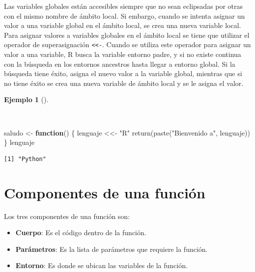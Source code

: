 \documentclass[
  spanish,
  a4paper,
]{scrreport}
\newenvironment{Shaded}{\begin{snugshade}}{\end{snugshade}}
\newcommand{\ControlFlowTok}[1]{\textcolor[rgb]{0.00,0.23,0.31}{\textbf{#1}}}
\newcommand{\FunctionTok}[1]{\textcolor[rgb]{0.28,0.35,0.67}{#1}}
\newcommand{\NormalTok}[1]{\textcolor[rgb]{0.00,0.23,0.31}{#1}}
\newcommand{\OtherTok}[1]{\textcolor[rgb]{0.00,0.23,0.31}{#1}}
\newcommand{\StringTok}[1]{\textcolor[rgb]{0.13,0.47,0.30}{#1}}
\providecommand{\tightlist}{%
  \setlength{\itemsep}{0pt}\setlength{\parskip}{0pt}}
\theoremstyle{definition}
\theoremstyle{definition}
\newtheorem{example}{Ejemplo}[chapter]
\theoremstyle{remark}
\begin{document}
Las variables globales están accesibles siempre que no sean eclipsadas
por otras con el mismo nombre de ámbito local. Si embargo, cuando se
intenta asignar un valor a una variable global en el ámbito local, se
crea una nueva variable local. Para asignar valores a variables globales
en el ámbito local se tiene que utilizar el operador de superasignación
\texttt{\textless{}\textless{}-}. Cuando se utiliza este operador para
asignar un valor a una variable, R busca la variable entorno padre, y si
no existe continua con la búsqueda en los entornos ancestros hasta
llegar a entorno global. Si la búsqueda tiene éxito, asigna el nuevo
valor a la variable global, mientras que si no tiene éxito se crea una
nueva variable de ámbito local y se le asigna el valor.

\begin{example}[]\protect\hypertarget{exm-superasignacion}{}\label{exm-superasignacion}

~

\begin{Shaded}
\begin{Highlighting}[]
\NormalTok{saludo }\OtherTok{\textless{}{-}} \ControlFlowTok{function}\NormalTok{() \{}
\NormalTok{  lenguaje }\OtherTok{\textless{}\textless{}{-}} \StringTok{"R"}
  \FunctionTok{return}\NormalTok{(}\FunctionTok{paste}\NormalTok{(}\StringTok{"Bienvenido a"}\NormalTok{, lenguaje))}
\NormalTok{\}}
\NormalTok{lenguaje}
\end{Highlighting}
\end{Shaded}

\begin{verbatim}
[1] "Python"
\end{verbatim}

\end{example}

\section{Componentes de una
función}\label{componentes-de-una-funciuxf3n}

Los tres componentes de una función son:

\begin{itemize}
\tightlist
\item
  \textbf{Cuerpo}: Es el código dentro de la función.
\item
  \textbf{Parámetros}: Es la lista de parámetros que requiere la
  función.
\item
  \textbf{Entorno}: Es donde se ubican las variables de la función.
\end{itemize}
\end{document}
